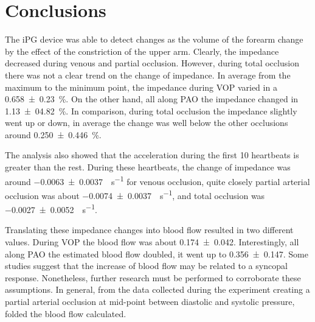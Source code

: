 \section{Conclusions}
\label{section occlusion 3}
The iPG device was able to detect changes as the volume of the forearm change by the effect of the constriction of the upper arm. Clearly, the impedance decreased during venous and partial occlusion. However, during total occlusion there was not a clear trend on the change of impedance. In average from the maximum to the minimum point, the impedance during VOP varied in a \SI{0.658(0230)}{\percent}. On the other hand, all along PAO the impedance changed in \SI{1.13(0482)}{\percent}. In comparison, during total occlusion the impedance slightly went up or down, in average the change was well below the other occlusions around \SI{0.250(0446)}{\percent}. 

The analysis also showed that the acceleration during the first 10 heartbeats is greater than the rest. During these heartbeats, the change of impedance was around \SI{-0.0063(00037)}{\Omega \per \second} for venous occlusion, quite closely partial arterial occlusion was about \SI{-0.0074(00037)}{\Omega \per \second}, and total occlusion was \SI{-0.0027(00052)}{\Omega \per \second}. 

Translating these impedance changes into blood flow resulted in two different values. During VOP the blood flow was about \SI{0.174(0042)}{\bfv}. Interestingly, all along PAO the estimated blood flow doubled, it went up to \SI{0.356(0147)}{\bfv}. Some studies \cite{joyner2001belfast, hainsworth2003syncope} suggest that the increase of blood flow may be related to a syncopal response. Nonetheless, further research must be performed to corroborate these assumptions.  In general, from the data collected during the experiment creating a partial arterial occlusion at mid-point between diastolic and systolic pressure, folded the blood flow calculated. 

